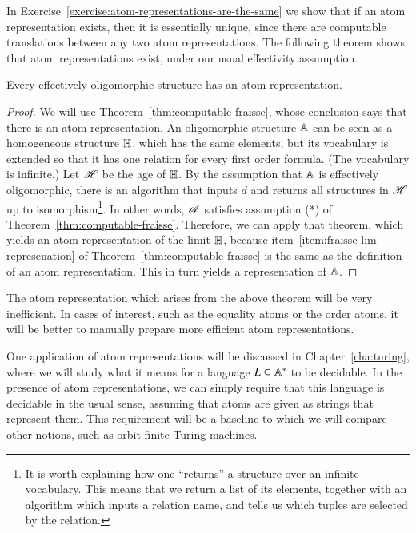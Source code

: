 In Exercise~\ref{exercise:atom-representations-are-the-same} we show that if an atom representation exists, then it is essentially unique, since there are computable translations between any two atom representations. The following theorem shows that atom representations exist, under our usual effectivity assumption. 
\begin{theorem}\label{thm:atom-represenation-must-exist}
Every  effectively oligomorphic structure has an atom representation.
\end{theorem}
\begin{proof}
	We will use Theorem~\ref{thm:computable-fraisse}, whose conclusion says that there is an atom representation.  
		An oligomorphic structure $\mathbb A$  can be seen as a homogeneous structure $\mathbb H$, which has the same elements, but its  vocabulary is extended so that it has one relation for every first order formula. 
	(The vocabulary is infinite.)  Let $\mathscr H$ be the age of $\mathbb H$. By the assumption that $\mathbb A$ is effectively oligomorphic, there is an algorithm that inputs $d$ and returns 
all structures in $\mathscr H$ up to isomorphism\footnote{It is worth explaining how one ``returns'' a structure over an infinite vocabulary. This means that we return a list of its elements, together with an algorithm which inputs a relation name, and tells us which tuples are selected by the relation.}. In other words, $\mathscr A$ satisfies  assumption (*) of Theorem~\ref{thm:computable-fraisse}. Therefore, we can apply that theorem, which yields an atom representation of the \fraisse limit $\mathbb H$, because item~\ref{item:fraisse-lim-represenation} of Theorem~\ref{thm:computable-fraisse} is the same as the definition of an atom representation. This in  turn yields a representation of $\mathbb A$. 
\end{proof}

The atom representation which arises from the above theorem will be very inefficient.  In cases of interest, such as the equality atoms or the order atoms, it will be better to manually prepare more efficient atom representations.

One  application of atom representations will be discussed in Chapter~\ref{cha:turing}, where we will study what it means for a language $L \subseteq \mathbb A^*$ to be decidable. In the presence of atom representations, we can simply require that this language is decidable in the usual sense, assuming that atoms are given as strings that represent them. This requirement will be a baseline to which we will compare other notions, such as orbit-finite Turing machines. 

